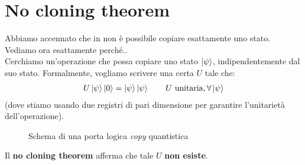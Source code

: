 \documentclass[../../InformazioneQuantistica.tex]{subfiles}
\begin{document}
\section{No cloning theorem}
Abbiamo accennato che in \MQ non è possibile copiare esattamente uno stato. Vediamo ora esattamente perché..\\

Cerchiamo un'operazione che possa copiare uno stato $\Ket{\psi}$, indipendentemente dal suo stato. Formalmente, vogliamo scrivere una certa $U$ tale che:
\begin{align}
U\Ket{\psi}\Ket{0} = \Ket{\psi}\Ket{\psi} \qquad U \text{ unitaria}, \forall \Ket{\psi} \label{eqn:Ucopy}
\end{align}
(dove stiamo usando due registri di pari dimensione per garantire l'unitarietà dell'operazione).

\begin{figure}[H]
\centering

\caption{Schema di una porta logica \textit{copy} quantistica\label{fig:copy-mq}}
\end{figure}

Il \textbf{no cloning theorem} afferma che tale $U$ \textbf{non esiste}.\\
\end{document}
